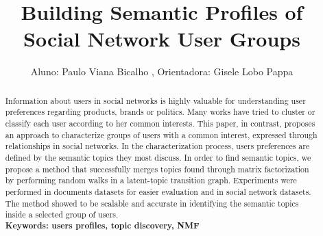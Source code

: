 \documentclass[12pt]{article}
\title{Building Semantic Profiles of Social Network User Groups}
\author{Aluno: Paulo Viana Bicalho \inst{1}, Orientadora: Gisele Lobo Pappa \inst{1} }
\begin{document}
\newcommand{\fhmourao}[1]{{\color{red}[#1]}}
\newcommand{\gi}[1]{{\color{blue}[#1]}}
\newcommand{\method}{UPsCAle }













\date{}

\maketitle

 

\begin{abstract} \small\baselineskip=9pt 
Information about users in social networks is highly valuable for
understanding user preferences regarding products, brands or politics. Many
works have tried to cluster or classify each user according to her common
interests. This paper, in contrast, proposes an approach to characterize
groups of users with a common interest, expressed through relationships in
social networks. In the characterization process, users preferences are
defined by the semantic topics they most discuss. In order to find semantic
topics, we propose a method that successfully merges topics found through
matrix factorization by performing random walks in a latent-topic transition
graph. Experiments were performed in documents datasets for easier evaluation
and in social network datasets. The method showed to be scalable and accurate
in identifying the semantic topics inside a selected group of users.\\
\textbf{Keywords: users profiles, topic discovery, NMF}
\end{abstract}

 










\end{document}
